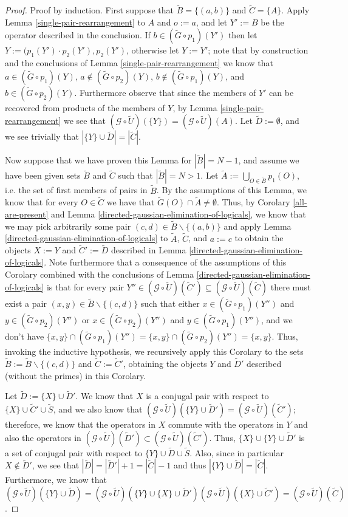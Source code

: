 \documentclass[twocolumn,showpacs,preprintnumbers,amsmath,amssymb,nofootinbib,pra,floatfix]{revtex4-1}
\newcommand{\set}{\tilde}
\newcommand{\genfun}{\mathcal{G}}
\begin{document}
\begin{proof}
Proof by induction.  First suppose that $\set B=\{(a,b)\}$ and $\set C=\{A\}$.  Apply Lemma \ref{single-pair-rearrangement} to $A$ and $o:=a$, and let $Y':=B$ be the operator described in the conclusion.  If $b\in (\set G\circ p_1)(Y')$ then let $Y:=(p_1(Y')\cdot p_2(Y'),p_2(Y')$, otherwise let $Y:=Y'$;  note that by construction and the conclusions of Lemma \ref{single-pair-rearrangement} we know that $a\in (\set G \circ p_1)(Y)$, $a\notin (\set G\circ p_2)(Y)$, $b\notin (\set G \circ p_1)(Y)$, and $b\in (\set G \circ p_2)(Y)$.  Furthermore observe that since the members of $Y'$ can be recovered from products of the members of $Y$, by Lemma \ref{single-pair-rearrangement} we see that $(\genfun\circ\set U)(\{Y\})=(\genfun\circ\set U)(A)$.  Let $\set D:=\emptyset$, and we see trivially that $|\{Y\}\cup \set D| = |\set C|$.

Now suppose that we have proven this Lemma for $|\set B|=N-1$, and assume we have been given sets $\set B$ and $\set C$ such that $|\set B|=N>1$.  Let $\set A:=\bigcup_{O\in\set B} p_1(O)$, i.e. the set of first members of pairs in $\set B$.  By the assumptions of this Lemma, we know that for every $O\in\set C$ we have that $\set G(O) \cap \set A \ne \emptyset$.  Thus, by Corolary \ref{all-are-present} and Lemma \ref{directed-gaussian-elimination-of-logicals}, we know that we may pick arbitrarily some pair $(c,d)\in\set B\backslash\{(a,b)\}$ and apply Lemma \ref{directed-gaussian-elimination-of-logicals} to $\set A$, $\set C$, and $a:=c$ to obtain the objects $X:=Y$ and $\set C':=\set D$ described in Lemma \ref{directed-gaussian-elimination-of-logicals}.  Note furthermore that a consequence of the assumptions of this Corolary combined with the conclusions of Lemma \ref{directed-gaussian-elimination-of-logicals} is that for every pair $Y''\in(\genfun\circ\set U)(\set C')\subseteq(\genfun\circ\set U)(\set C)$ there must exist a pair $(x,y)\in\set B\backslash\{(c,d)\}$ such that either $x\in (\set G\circ p_1)(Y'')$ and $y\in (\set G\circ p_2)(Y'')$ or $x\in (\set G\circ p_2)(Y'')$ and $y\in (\set G\circ p_1)(Y'')$, and we don't have $\{x,y\}\cap(\set G\circ p_1)(Y'')=\{x,y\}\cap(\set G\circ p_2)(Y'')=\{x,y\}$.  Thus, invoking the inductive hypothesis, we recursively apply this Corolary to the sets $\set B:=\set B\backslash\{(c,d)\}$ and $\set C:=\set C'$, obtaining the objects $Y$ and $\set D'$ described (without the primes) in this Corolary.

Let $\set D:=\{X\}\cup\set D'$.  We know that $X$ is a conjugal pair with respect to $\{X\}\cup\set C'\cup\set S$, and we also know that $(\genfun\circ\set U)(\{Y\}\cup\set D')=(\genfun\circ\set U)(\set C')$;  therefore, we know that the operators in $X$ commute with the operators in $Y$ and also the operators in $(\genfun\circ\set U)(\set D')\subset(\genfun\circ\set U)(\set C')$.  Thus, $\{X\}\cup\{Y\}\cup\set D'$ is a set of conjugal pair with respect to $\{Y\}\cup\set D\cup\set S$.   Also, since in particular $X\notin\set D'$, we see that  $|\set D|=|\set D'|+1=|\set C|-1$ and thus $|\{Y\}\cup\set D|=|\set C|$.  Furthermore, we know that $(\genfun\circ\set U)(\{Y\}\cup\set D)=(\genfun\circ\set U)(\{Y\}\cup\{X\}\cup\set D')(\genfun\circ\set U)(\{X\}\cup\set C')=(\genfun\circ\set U)(\set C)$.


\end{proof}
\end{document}
